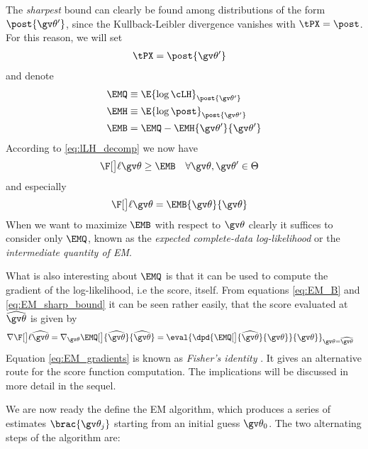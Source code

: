The \emph{sharpest} bound can clearly be found among
distributions of the form $\post{\Th'}$, since the Kullback-Leibler divergence vanishes with $\tPX=\post$.
For this reason, we will set
\begin{align}
	\tPX &= \post{\Th'}
\end{align} 
and denote
\begin{align}
	\EMQ &\equiv \E{\log\cLH}_{\post{\Th'}} \label{eq:EM_Q}\\
	\EMH &\equiv \E{\log\post}_{\post{\Th'}} \label{eq:EM_H}\\
	\EMB &= \EMQ - \EMH{\Th'}{\Th'} \label{eq:EM_B}
\end{align}
According to \eqref{eq:lLH_decomp} we now have
\begin{align}
	\lLH & \geq \EMB \quad \forall \Th,\Th' \in \Theta
	\label{eq:EM_LB}
\end{align}
and especially
\begin{align}
	\lLH & = \EMB{\Th}{\Th}
	\label{eq:EM_sharp_bound}
\end{align}
When we want to maximize $\EMB$ with respect to $\Th$
clearly it suffices to consider
only $\EMQ$, known as the \emph{expected complete-data log-likelihood}
or the \emph{intermediate quantity of EM}.

What is also interesting about $\EMQ$ is that it can be used to compute the gradient of the log-likelihood, i.e
the score, itself. From equations \eqref{eq:EM_B}
and \eqref{eq:EM_sharp_bound} it can be seen rather easily, that  
the score evaluated at $\widehat{\Th}$ is given by
\begin{align}
		\score[\widehat\Th]&=
		\nabla_{\Th}\EMQ[\big]{\widehat\Th}{\widehat\Th}
		=\eval{\dpd{ \EMQ[\big]{\widehat\Th}{\Th}}{\Th}}_{\Th=\widehat\Th} \label{eq:EM_gradients}
\end{align} 
Equation \eqref{eq:EM_gradients} is known as \emph{Fisher's identity} \parencite{Cappe2005}. It gives
an alternative route for the score function computation.
The implications will be discussed in more detail in the sequel.
 

We are now ready the define the EM algorithm, 
which produces a series of estimates $\brac{\Th_j}$
starting from an initial guess $\Th_0$. The two alternating
steps of the algorithm are:

